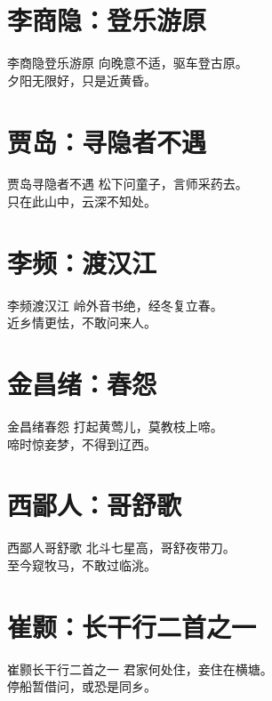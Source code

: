 \documentclass[12pt,oneside,a5paper]{book}
\begin{document}
\chapter{李商隐：登乐游原}
\begin{poemzh}{李商隐}{登乐游原}
向晚意不适，驱车登古原。\\
夕阳无限好，只是近黄昏。\\ 
\end{poemzh}

\chapter{贾岛：寻隐者不遇}
\begin{poemzh}{贾岛}{寻隐者不遇}
松下问童子，言师采药去。\\
只在此山中，云深不知处。\\ 
\end{poemzh}

\chapter{李频：渡汉江}
\begin{poemzh}{李频}{渡汉江}
岭外音书绝，经冬复立春。\\
近乡情更怯，不敢问来人。\\ 
\end{poemzh}

\chapter{金昌绪：春怨}
\begin{poemzh}{金昌绪}{春怨}
打起黄莺儿，莫教枝上啼。\\
啼时惊妾梦，不得到辽西。\\ 
\end{poemzh}

\chapter{西鄙人：哥舒歌}
\begin{poemzh}{西鄙人}{哥舒歌}
北斗七星高，哥舒夜带刀。\\
至今窥牧马，不敢过临洮。\\ 
\end{poemzh}

\chapter{崔颢：长干行二首之一}
\begin{poemzh}{崔颢}{长干行二首之一}
君家何处住，妾住在横塘。\\
停船暂借问，或恐是同乡。\\ 
\end{poemzh}
\end{document}

